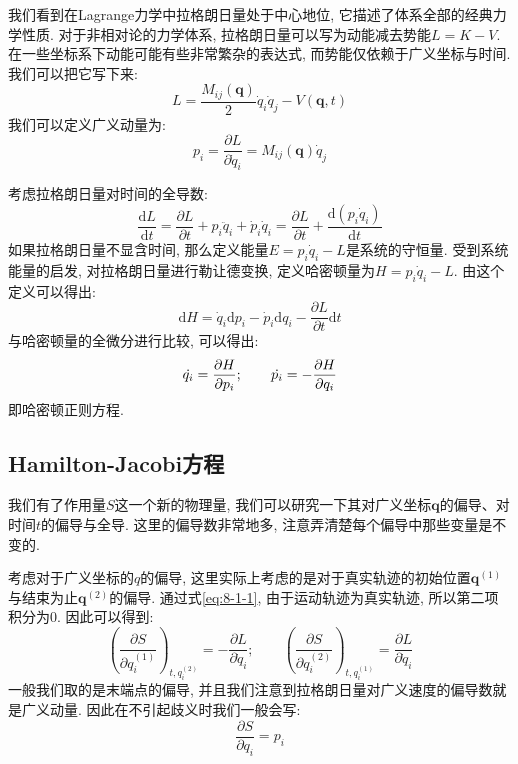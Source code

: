         我们看到在Lagrange力学中拉格朗日量处于中心地位, 它描述了体系全部的经典力学性质. 对于非相对论的力学体系, 拉格朗日量可以写为动能减去势能$L = K - V$. 在一些坐标系下动能可能有些非常繁杂的表达式, 而势能仅依赖于广义坐标与时间. 我们可以把它写下来:
        \begin{equation}
            L =  \frac{M_{ij}(\bm q)}{2} \dot q_i \dot q_j  - V(\bm q, t)
        \end{equation}
        我们可以定义广义动量为: 
        \begin{equation}
            p_i =\frac{\partial L}{\partial \dot q_i} = M_{ij}(\bm q) \dot q_j
        \end{equation}

        \splitline

        考虑拉格朗日量对时间的全导数:
        \begin{equation}
            \frac{\mathrm{d} L}{\mathrm{d} t} = \frac{\partial L}{\partial t} + p_i \ddot q_i + \dot p_i \dot q_i = \frac{\partial L}{\partial t} +  \frac{\mathrm{d} (p_i \dot q_i)}{\mathrm{d} t}
        \end{equation}
        如果拉格朗日量不显含时间, 那么定义能量$E = p_i \dot q_i - L$是系统的守恒量. 
        受到系统能量的启发, 对拉格朗日量进行勒让德变换, 定义哈密顿量为$H = p_i \dot q_i - L$. 
        由这个定义可以得出:
        \begin{equation}
            \mathrm{d} H = \dot q_i \mathrm{d} p_i - \dot p_i \mathrm{d} q_i - \frac{\partial L}{\partial t} \mathrm{d} t
        \end{equation}
        与哈密顿量的全微分进行比较, 可以得出:
        \begin{equation}
            \dot{q_{i}} = \frac{\partial{H}}{\partial{p_i}};
            \qquad
            \dot{p_{i}} = -\frac{\partial{H}}{\partial{q_i}}
        \end{equation}
        即哈密顿正则方程.

        \subsection{Hamilton-Jacobi方程}

        我们有了作用量$S$这一个新的物理量, 我们可以研究一下其对广义坐标$\bm q$的偏导、对时间$t$的偏导与全导. 这里的偏导数非常地多, 注意弄清楚每个偏导中那些变量是不变的. 

        考虑对于广义坐标的$q$的偏导, 这里实际上考虑的是对于真实轨迹的初始位置$\bm q^{(1)}$与结束为止$\bm q^{(2)}$的偏导. 通过式\ref{eq:8-1-1}, 由于运动轨迹为真实轨迹, 所以第二项积分为0. 因此可以得到: 
        \begin{equation}
            \left( \frac{\partial S}{\partial q_i^{(1)}} \right)_{t, q_i^{(2)}} = - \frac{\partial L}{\partial \dot q_i};
            \qquad
            \left(\frac{\partial S}{\partial q_i^{(2)}}\right)_{t, q_i^{(1)}} = \frac{\partial L}{\partial \dot q_i}
        \end{equation}
        一般我们取的是末端点的偏导, 并且我们注意到拉格朗日量对广义速度的偏导数就是广义动量. 因此在不引起歧义时我们一般会写: 
        \begin{equation}
            \frac{\partial S}{\partial q_i} = p_i
        \end{equation}

